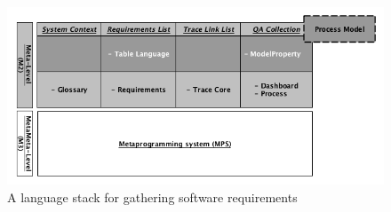 \begin{figure}[!h]
\centering
\includegraphics[width=.75\textwidth]{./figures/Fig2.png}
\vspace{-.5cm}
\caption{A language stack for gathering software requirements
}
\label{fig:meta_struct_reqs}
\vspace{-.5cm}
\end{figure}

